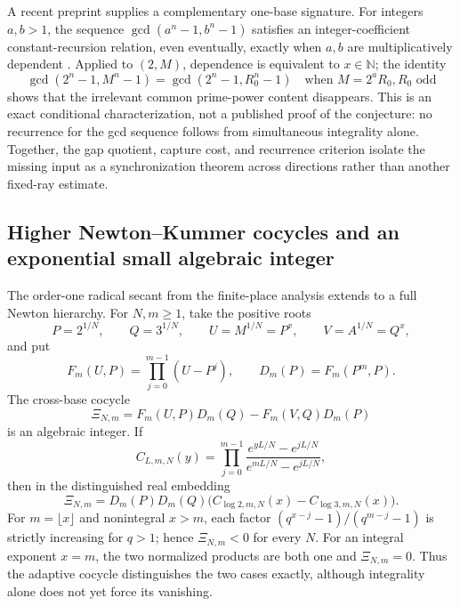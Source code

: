 \documentclass[11pt,oneside]{article}
\theoremstyle{definition}
\theoremstyle{remark}
\newcommand{\N}{\mathbb N}
\begin{document}
A recent preprint supplies a complementary one-base signature.  For integers $a,b>1$, the
sequence $\gcd(a^n-1,b^n-1)$ satisfies an integer-coefficient constant-recursion relation,
even eventually, exactly when $a,b$ are multiplicatively dependent
\cite{NguyenDang2026}.  Applied to $(2,M)$, dependence is equivalent to $x\in\N$; the
identity
\[
 \gcd(2^n-1,M^n-1)=\gcd(2^n-1,R_0^n-1)
 \quad\text{when }M=2^aR_0, R_0\text{ odd}
\]
shows that the irrelevant common prime-power content disappears.  This is an exact
conditional characterization, not a published proof of the conjecture: no recurrence for
the gcd sequence follows from simultaneous integrality alone.  Together, the gap quotient,
capture cost, and recurrence criterion isolate the missing input as a synchronization
theorem across directions rather than another fixed-ray estimate.

\subsection{Higher Newton--Kummer cocycles and an exponential small algebraic integer}
\label{crit:newton-kummer}

The order-one radical secant from the finite-place analysis extends to a full Newton
hierarchy.  For
$N,m\ge1$, take the positive roots
\[
 P=2^{1/N},\qquad Q=3^{1/N},\qquad
 U=M^{1/N}=P^x,\qquad V=A^{1/N}=Q^x,
\]
and put
\[
 F_m(U,P)=\prod_{j=0}^{m-1}(U-P^j),\qquad
 D_m(P)=F_m(P^m,P).
\]
The cross-base cocycle
\begin{equation}
 \boxed{\Xi_{N,m}=F_m(U,P)D_m(Q)-F_m(V,Q)D_m(P)}
 \label{crit:eq-newton-kummer}
\end{equation}
is an algebraic integer.  If
\[
 C_{L,m,N}(y)=\prod_{j=0}^{m-1}
 \frac{e^{yL/N}-e^{jL/N}}{e^{mL/N}-e^{jL/N}},
\]
then in the distinguished real embedding
\begin{equation}
 \Xi_{N,m}=D_m(P)D_m(Q)
 \bigl(C_{\log2,m,N}(x)-C_{\log3,m,N}(x)\bigr).
 \label{crit:eq-newton-kummer-normalized}
\end{equation}
For $m=\lfloor x\rfloor$ and nonintegral $x>m$, each factor
$(q^{x-j}-1)/(q^{m-j}-1)$ is strictly increasing for $q>1$; hence
$\Xi_{N,m}<0$ for every $N$.  For an integral exponent $x=m$, the two normalized products
are both one and $\Xi_{N,m}=0$.  Thus the adaptive cocycle distinguishes the two cases
exactly, although integrality alone does not yet force its vanishing.
\end{document}
